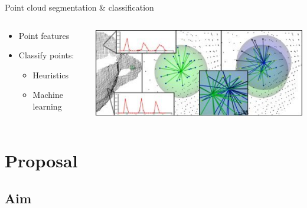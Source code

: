 \documentclass[compress]{beamer}
\begin{document}
\begin{frame}{Point cloud segmentation \& classification}

\begin{columns}[T]
\begin{column}{0.5\textwidth}

\begin{itemize}
\item Point features
\item Classify points:
\begin{itemize}
\item Heuristics
\item Machine learning
\end{itemize}
\end{itemize}

\end{column}

\begin{column}{0.5\textwidth}

\includegraphics[width=1\textwidth]{pics/features.png}

\end{column}
\end{columns}
\end{frame}

%
%


\section{Proposal}

\subsection{Aim}
\end{document}
